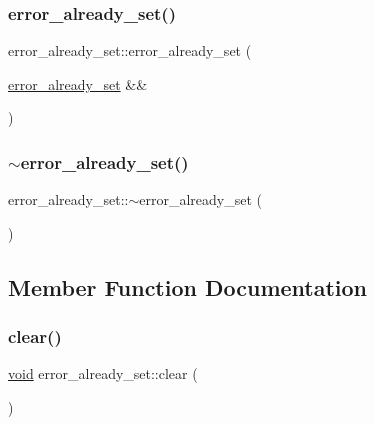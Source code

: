 \mbox{\label{classerror__already__set_a77db6b6c5770db3ec72f6e522375084a}} 
\subsubsection{\texorpdfstring{error\_already\_set()}{error\_already\_set()}\hspace{0.1cm}{\footnotesize\ttfamily [3/3]}}
{\footnotesize\ttfamily error\+\_\+already\+\_\+set\+::error\+\_\+already\+\_\+set (\begin{DoxyParamCaption}\item[{\mbox{\hyperlink{classerror__already__set}{error\+\_\+already\+\_\+set}} \&\&}]{ }\end{DoxyParamCaption})\hspace{0.3cm}{\ttfamily [default]}}

\mbox{\label{classerror__already__set_a18ad333137ef5b23916ff207a38e9a6a}} 
\subsubsection{\texorpdfstring{$\sim$error\_already\_set()}{~error\_already\_set()}}
{\footnotesize\ttfamily error\+\_\+already\+\_\+set\+::$\sim$error\+\_\+already\+\_\+set (\begin{DoxyParamCaption}{ }\end{DoxyParamCaption})\hspace{0.3cm}{\ttfamily [inline]}}



\subsection{Member Function Documentation}
\mbox{\label{classerror__already__set_a471237e45e4049e9e9ec4bc049621eb1}} 
\subsubsection{\texorpdfstring{clear()}{clear()}}
{\footnotesize\ttfamily \mbox{\hyperlink{_s_d_l__opengles2__gl2ext_8h_ae5d8fa23ad07c48bb609509eae494c95}{void}} error\+\_\+already\+\_\+set\+::clear (\begin{DoxyParamCaption}{ }\end{DoxyParamCaption})\hspace{0.3cm}{\ttfamily [inline]}}

